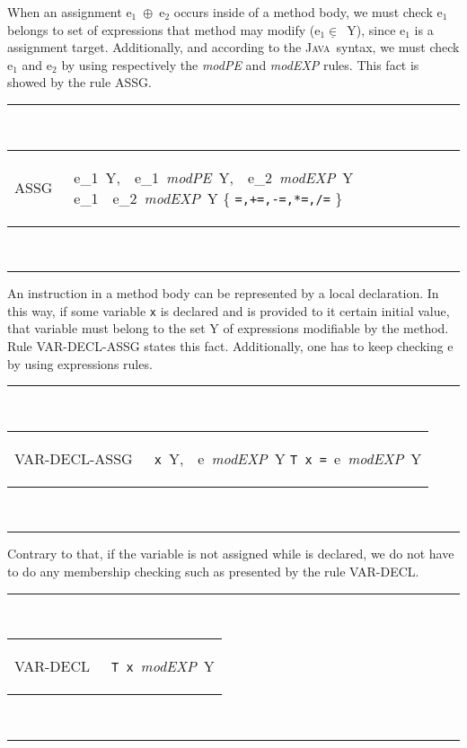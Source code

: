 \documentclass[a4paper]{llncs}
\newcommand{\java}{\textsc{Java}}
\begin{document}
When an assignment \textup{e}$_1$\ $\oplus$\
\textup{e}$_2$ occurs inside of a method body, we must check
\textup{e}$_1$ belongs to set of expressions that method may modify
(\textup{e}$_1\underline{\in}$\ \textsc{Y}), since \textup{e}$_1$ is a
assignment target. Additionally, and according to the
\java~syntax, we must check \textup{e}$_1$ and \textup{e}$_2$ by
using respectively the \textit{modPE} and \textit{modEXP} rules. This
fact is showed by the rule \textup{ASSG}.
\begin{table}[hbt] %
\rule{\linewidth}{0.25mm}
\\[0.5ex]
\begin{tabular}{ll}
ASSG\,\,\, & 
\begin{prooftree}
\textup{e}_1\underline{\in}\ \textsc{Y},\ \ \textup{e}_1\
\textit{modPE}\ \textsc{Y},\ \ \textup{e}_2\ \textit{modEXP}\
\textsc{Y}
\justifies
\textup{e}_1\ \oplus\ \textup{e}_2\ \textit{modEXP}\ \textsc{Y}
\using
\oplus \in \{ \texttt{=,+=,-=,*=,/=} \}
\end{prooftree}
\end{tabular}
\\[0.5ex]
\rule{\linewidth}{0.25mm}
\end{table} %

An instruction in a method body can be represented by a local
declaration. In this way, if some variable \texttt{x} is declared and is
provided to it certain initial value, that variable must belong to the
set \textsc{Y} of expressions modifiable by the method. Rule
\textup{VAR-DECL-ASSG} states this fact. Additionally, one has to 
keep checking \textup{e} by using expressions rules.
\begin{table}[hbt] %
\rule{\linewidth}{0.25mm}
\\[0.5ex]
\begin{tabular}{ll}
VAR-DECL-ASSG\,\,\, & 
\begin{prooftree}
\rule[1ex]{0em}{1.5ex}
\texttt{x}\underline{\in}\ \textsc{Y},\ \ \textup{e}\ \textit{modEXP}\ \textsc{Y}
\justifies
\texttt{T x =}\ \textup{e}\ \textit{modEXP}\ \textsc{Y}
\end{prooftree}
\end{tabular}
\\[0.5ex]
\rule{\linewidth}{0.25mm}
\end{table} %

Contrary to that, if the variable is not
assigned while is declared, we do not have to do any
membership checking such as presented by the rule \textup{VAR-DECL}.
\begin{table}[hbt] %
\rule{\linewidth}{0.25mm}
\\[0.5ex]
\begin{tabular}{ll}
VAR-DECL\,\,\, & 
\begin{prooftree}
\justifies
\texttt{T x}\ \textit{modEXP}\ \textsc{Y}
\using
\end{prooftree}
\end{tabular}
\\[0.5ex]
\rule{\linewidth}{0.25mm}
\end{table} %
\end{document}
